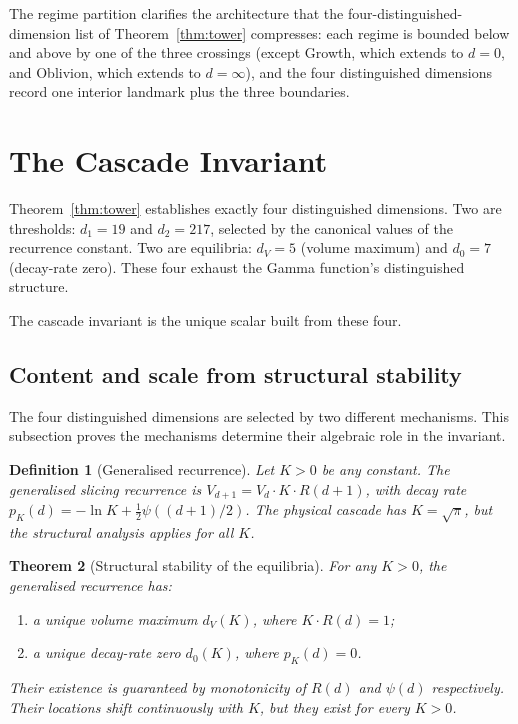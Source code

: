\documentclass[11pt,a4paper]{article}
\newtheorem{theorem}{Theorem}[section]
\newtheorem{definition}[theorem]{Definition}
\begin{document}
The regime partition clarifies the architecture that the
four-distinguished-dimension list of Theorem~\ref{thm:tower} compresses:
each regime is bounded below and above by one of the three crossings
(except Growth, which extends to $d=0$, and Oblivion, which extends to
$d=\infty$), and the four distinguished dimensions record one interior
landmark plus the three boundaries.

\section{The Cascade Invariant}\label{sec:the-cascade-invariant}

Theorem~\ref{thm:tower} establishes exactly four distinguished dimensions.
Two are thresholds: $d_1 = 19$ and $d_2 = 217$, selected by the canonical
values of the recurrence constant. Two are equilibria: $d_V = 5$ (volume
maximum) and $d_0 = 7$ (decay-rate zero). These four exhaust the Gamma
function's distinguished structure.

The cascade invariant is the unique scalar built from these four.

\subsection{Content and scale from structural stability}

The four distinguished dimensions are selected by two different
mechanisms. This subsection proves the mechanisms determine their algebraic
role in the invariant.

\begin{definition}[Generalised recurrence]\label{def:general}
Let $K > 0$ be any constant. The generalised slicing recurrence is
$V_{d+1} = V_d\cdot K\cdot R(d+1)$, with decay rate
$p_K(d) = -\ln K + \tfrac{1}{2}\psi((d+1)/2)$. The physical cascade has
$K = \sqrt{\pi}$, but the structural analysis applies for all $K$.
\end{definition}

\begin{theorem}[Structural stability of the equilibria]\label{thm:stable}
For any $K > 0$, the generalised recurrence has:
\begin{enumerate}
\item[(a)] a unique volume maximum $d_V(K)$, where $K\cdot R(d) = 1$;
\item[(b)] a unique decay-rate zero $d_0(K)$, where $p_K(d) = 0$.
\end{enumerate}
Their existence is guaranteed by monotonicity of $R(d)$ and $\psi(d)$
respectively. Their locations shift continuously with $K$, but they
exist for every $K > 0$.
\end{theorem}
\end{document}
